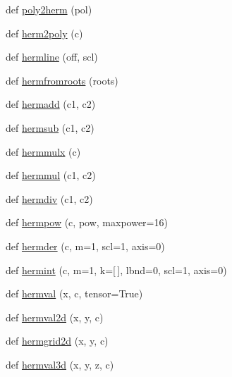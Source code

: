 \begin{DoxyCompactItemize}
\item 
def \hyperlink{namespacenumpy_1_1polynomial_1_1hermite_ab778d0c46658fca79de8c9ae4ddcc283}{poly2herm} (pol)
\item 
def \hyperlink{namespacenumpy_1_1polynomial_1_1hermite_ab623029878ab9c87eed73daa35c3c833}{herm2poly} (c)
\item 
def \hyperlink{namespacenumpy_1_1polynomial_1_1hermite_a423e61f5d93b56117ebf5b8e971ab62e}{hermline} (off, scl)
\item 
def \hyperlink{namespacenumpy_1_1polynomial_1_1hermite_ab7e76d5b5e51dc804c63baff0f0b9af5}{hermfromroots} (roots)
\item 
def \hyperlink{namespacenumpy_1_1polynomial_1_1hermite_ac11d10b479c34307cc42be929488322c}{hermadd} (c1, c2)
\item 
def \hyperlink{namespacenumpy_1_1polynomial_1_1hermite_a45c79927cd8fd43a8e3319d19ac8dc17}{hermsub} (c1, c2)
\item 
def \hyperlink{namespacenumpy_1_1polynomial_1_1hermite_a1d7981c5a02763915f5d5ae7c3d90f54}{hermmulx} (c)
\item 
def \hyperlink{namespacenumpy_1_1polynomial_1_1hermite_a3c0422f4a9d81ccb4789a3518935550a}{hermmul} (c1, c2)
\item 
def \hyperlink{namespacenumpy_1_1polynomial_1_1hermite_a0ceadea040b69882c2a783b21adc4b4d}{hermdiv} (c1, c2)
\item 
def \hyperlink{namespacenumpy_1_1polynomial_1_1hermite_a18a077fe84196b8cf187e30209c89fc6}{hermpow} (c, pow, maxpower=16)
\item 
def \hyperlink{namespacenumpy_1_1polynomial_1_1hermite_a80f345ac93457086ee61c08d4f6a9bc8}{hermder} (c, m=1, scl=1, axis=0)
\item 
def \hyperlink{namespacenumpy_1_1polynomial_1_1hermite_a433a3f34578b90256486c532d2fd8210}{hermint} (c, m=1, k=\mbox{[}$\,$\mbox{]}, lbnd=0, scl=1, axis=0)
\item 
def \hyperlink{namespacenumpy_1_1polynomial_1_1hermite_ae26143d25de6333d811effa65e522117}{hermval} (x, c, tensor=True)
\item 
def \hyperlink{namespacenumpy_1_1polynomial_1_1hermite_a41ebca0ba98fa3e6aea923149a58bbf9}{hermval2d} (x, y, c)
\item 
def \hyperlink{namespacenumpy_1_1polynomial_1_1hermite_aeefd1ef748aeb65aea9cd696e6f1e474}{hermgrid2d} (x, y, c)
\item 
def \hyperlink{namespacenumpy_1_1polynomial_1_1hermite_ae916c6cf200f5c89ae9ca5c3849e37ed}{hermval3d} (x, y, z, c)

\end{DoxyCompactItemize}

